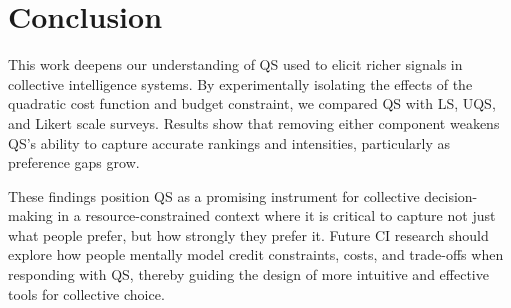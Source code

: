 \section{Conclusion}
This work deepens our understanding of QS used to elicit richer signals in collective intelligence systems. By experimentally isolating the effects of the quadratic cost function and budget constraint, we compared QS with LS, UQS, and Likert scale surveys. Results show that removing either component weakens QS’s ability to capture accurate rankings and intensities, particularly as preference gaps grow.

These findings position QS as a promising instrument for collective decision-making in a resource-constrained context where it is critical to capture not just what people prefer, but how strongly they prefer it. Future CI research should explore how people mentally model credit constraints, costs, and trade-offs when responding with QS, thereby guiding the design of more intuitive and effective tools for collective choice.

